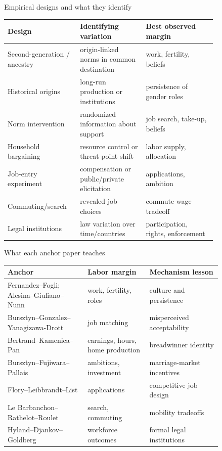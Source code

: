 \documentclass[aspectratio=169,11pt]{beamer}
\begin{document}
\begin{frame}{Empirical designs and what they identify}
\scriptsize
\setlength{\tabcolsep}{3pt}
\begin{tabular}{p{0.24\linewidth} p{0.28\linewidth} p{0.30\linewidth}}
\toprule
Design & Identifying variation & Best observed margin \\
\midrule
Second-generation / ancestry & origin-linked norms in common destination & work, fertility, beliefs \\
Historical origins & long-run production or institutions & persistence of gender roles \\
Norm intervention & randomized information about support & job search, take-up, beliefs \\
Household bargaining & resource control or threat-point shift & labor supply, allocation \\
Job-entry experiment & compensation or public/private elicitation & applications, ambition \\
Commuting/search & revealed job choices & commute-wage tradeoff \\
Legal institutions & law variation over time/countries & participation, rights, enforcement \\
\bottomrule
\end{tabular}
\end{frame}

\begin{frame}{What each anchor paper teaches}
\scriptsize
\begin{tabular}{p{0.31\linewidth} p{0.24\linewidth} p{0.29\linewidth}}
\toprule
Anchor & Labor margin & Mechanism lesson \\
\midrule
Fernandez--Fogli; Alesina--Giuliano--Nunn & work, fertility, roles & culture and persistence \\
Bursztyn--Gonzalez--Yanagizawa-Drott & job matching & misperceived acceptability \\
Bertrand--Kamenica--Pan & earnings, hours, home production & breadwinner identity \\
Bursztyn--Fujiwara--Pallais & ambitions, investment & marriage-market incentives \\
Flory--Leibbrandt--List & applications & competitive job design \\
Le Barbanchon--Rathelot--Roulet & search, commuting & mobility tradeoffs \\
Hyland--Djankov--Goldberg & workforce outcomes & formal legal institutions \\
\bottomrule
\end{tabular}
\end{frame}
\end{document}
